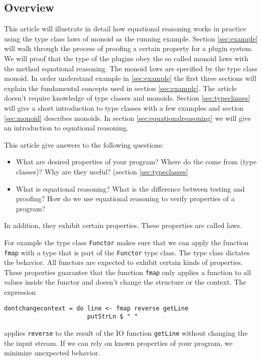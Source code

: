 \subsection{Overview}

This article will illustrate in detail how equational reasoning works in practice using the type class laws of monoid as the running example. Section \ref{sec:example} will walk through the process of proofing a certain property for a plugin system. We will proof that the type of the plugins obey the so called monoid laws with the method equational reasoning.  The monoid laws are specified by the type class monoid. In order understand  example in \ref{sec:example} the first three sections will explain the fundamental concepts used in section \ref{sec:example}. The article doesn't require knowledge of type classes and monoids. 
Section \ref{sec:typeclasses} will give a short introduction to type classes with a few examples and section \ref{sec:monoid} describes monoids. In section \ref{sec:equationalreasoning} we will give an introduction to equational reasoning.

This article give answers to the following questions:
\begin{itemize}
\item What are desired properties of your program? Where do the come from (type classes)? Why are they useful? (section \ref{sec:typeclasses}
\item What is equational reasoning? What is the difference between testing and proofing? How do we use equational reasoning to verify properties of a program?
\end{itemize}


 In addition, they exhibit certain properties. These properties are called laws. 


For example the type class \verb|Functor| makes sure that we can apply the function \verb|fmap| with a type that is part of the \verb|Functor| type class. The type class dictates the behavior. All functors are expected to exhibit certain kinds of properties. These properties guarantee that the function \verb|fmap| only applies a function to all values inside the functor and doesn't change the structure or the context. The expression
\begin{verbatim}
dontchangecontext = do line <- fmap reverse getLine
                       putStrLn $ " "
\end{verbatim}
applies \verb|reverse| to the result of the IO function \verb|getLine| without changing the the input stream. 
If we can rely on known properties of your program, we minimize unexpected behavior.

